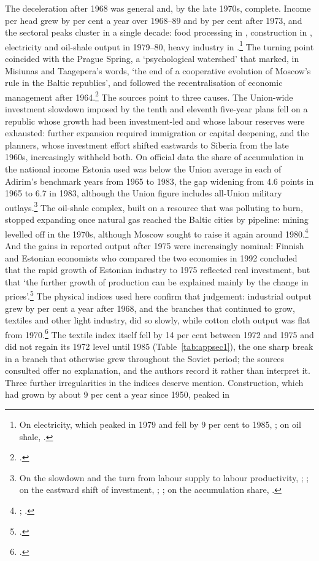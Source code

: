 The deceleration after 1968 was general and, by the late 1970s, complete. Income per head grew by  per cent a year over 1968--89 and by  per cent after 1973, and the sectoral peaks cluster in a single decade: food processing in , construction in , electricity and oil-shale output in 1979--80, heavy industry in .\footnote{On electricity, which peaked in 1979 and fell by 9 per cent to 1985, \autocite{taagepera2018}; on oil shale, \autocite[239]{years_of_dependence}.} The turning point coincided with the Prague Spring, a `psychological watershed' that marked, in Misiunas and Taagepera's words, `the end of a cooperative evolution of Moscow's rule in the Baltic republics', and followed the recentralisation of economic management after 1964.\footnote{\autocite[203, 227--8]{years_of_dependence}.} The sources point to three causes. The Union-wide investment slowdown imposed by the tenth and eleventh five-year plans fell on a republic whose growth had been investment-led and whose labour reserves were exhausted: further expansion required immigration or capital deepening, and the planners, whose investment effort shifted eastwards to Siberia from the late 1960s, increasingly withheld both. On official data the share of accumulation in the national income Estonia used was below the Union average in each of Adirim's benchmark years from 1965 to 1983, the gap widening from 4.6 points in 1965 to 6.7 in 1983, although the Union figure includes all-Union military outlays.\footnote{On the slowdown and the turn from labour supply to labour productivity, \autocite[128--63]{hanson2003}; \autocite[174]{kolde1978}; on the eastward shift of investment, \autocite[441, 446]{dienes1972}; \autocite[2]{ciasovietrep1970}; on the accumulation share, \autocite[53]{adirim1988}.} The oil-shale complex, built on a resource that was polluting to burn, stopped expanding once natural gas reached the Baltic cities by pipeline: mining levelled off in the 1970s, although Moscow sought to raise it again around 1980.\footnote{\autocite[188--9]{olaf_stalin}; \autocite[239]{years_of_dependence}.} And the gains in reported output after 1975 were increasingly nominal: Finnish and Estonian economists who compared the two economies in 1992 concluded that the rapid growth of Estonian industry to 1975 reflected real investment, but that `the further growth of production can be explained mainly by the change in prices'.\footnote{\autocite[39--40]{ahderajasalu1992}.} The physical indices used here confirm that judgement: industrial output grew by  per cent a year after 1968, and the branches that continued to grow, textiles and other light industry, did so slowly, while cotton cloth output was flat from 1970.\footnote{\autocite[41]{ahderajasalu1992}.} The textile index itself fell by 14 per cent between 1972 and 1975 and did not regain its 1972 level until 1985 (Table~\ref{tab:appsec1}), the one sharp break in a branch that otherwise grew throughout the Soviet period; the sources consulted offer no explanation, and the authors record it rather than interpret it. Three further irregularities in the indices deserve mention. Construction, which had grown by about 9 per cent a year since 1950, peaked in 